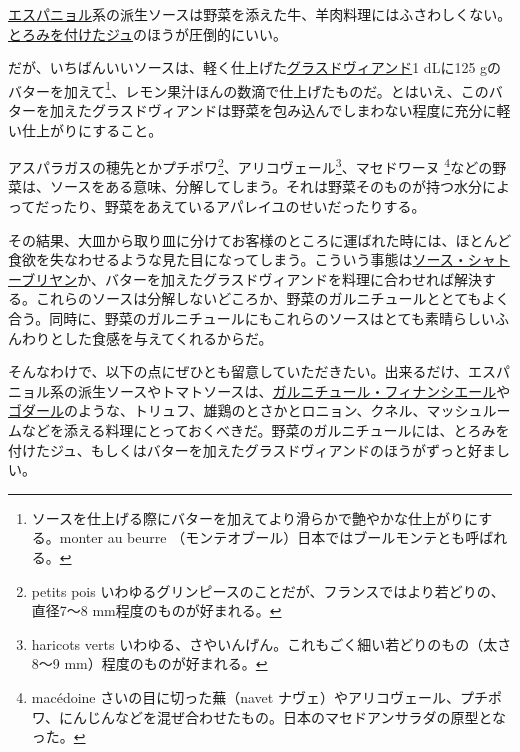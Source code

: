 \vspace{1\zw}

\protect\hyperlink{sauce-espagnole}{エスパニョル}系の派生ソースは野菜を添えた牛、羊肉料理にはふさわしくない。\protect\hyperlink{jus-de-veau-lie}{とろみを付けたジュ}のほうが圧倒的にいい。

だが、いちばんいいソースは、軽く仕上げた\protect\hyperlink{glace-de-viande}{グラスドヴィアンド}1
dLに125 gのバターを加えて\footnote{ソースを仕上げる際にバターを加えてより滑らかで艶やかな仕上がりにする。monter
  au beurre （モンテオブール）日本ではブールモンテとも呼ばれる。}、レモン果汁ほんの数滴で仕上げたものだ。とはいえ、このバターを加えたグラスドヴィアンドは野菜を包み込んでしまわない程度に充分に軽い仕上がりにすること。

アスパラガスの穂先とかプチポワ\footnote{petits pois
  いわゆるグリンピースのことだが、フランスではより若どりの、直径7〜8
  mm程度のものが好まれる。}、アリコヴェール\footnote{haricots verts
  いわゆる、さやいんげん。これもごく細い若どりのもの（太さ8〜9
  mm）程度のものが好まれる。}、マセドワーヌ \footnote{macédoine
  さいの目に切った蕪（navet
  ナヴェ）やアリコヴェール、プチポワ、にんじんなどを混ぜ合わせたもの。日本のマセドアンサラダの原型となった。}などの野菜は、ソースをある意味、分解してしまう。それは野菜そのものが持つ水分によってだったり、野菜をあえているアパレイユのせいだったりする。

その結果、大皿から取り皿に分けてお客様のところに運ばれた時には、ほとんど食欲を失なわせるような見た目になってしまう。こういう事態は\protect\hyperlink{sauce-chateaubriand}{ソース・シャトーブリヤン}か、バターを加えたグラスドヴィアンドを料理に合わせれば解決する。これらのソースは分解しないどころか、野菜のガルニチュールととてもよく合う。同時に、野菜のガルニチュールにもこれらのソースはとても素晴らしいふんわりとした食感を与えてくれるからだ。

そんなわけで、以下の点にぜひとも留意していただきたい。出来るだけ、エスパニョル系の派生ソースやトマトソースは、\protect\hyperlink{garniture-financiere}{ガルニチュール・フィナンシエール}や\protect\hyperlink{garniture-godard}{ゴダール}のような、トリュフ、雄鶏のとさかとロニョン、クネル、マッシュルームなどを添える料理にとっておくべきだ。野菜のガルニチュールには、とろみを付けたジュ、もしくはバターを加えたグラスドヴィアンドのほうがずっと好ましい。

